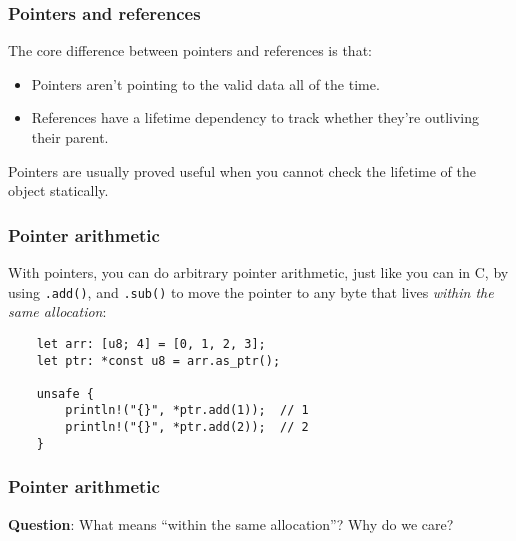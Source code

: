 \documentclass[aspectratio=1610,t]{beamer}
\begin{document}

\begin{frame}[fragile]
\frametitle{Pointers and references}
The core difference between pointers and references is that:

\begin{itemize}
    \item Pointers aren't pointing to the valid data all of the time.
    \item References have a lifetime dependency to track whether they're outliving their parent.
\end{itemize}

Pointers are usually proved useful when you cannot check the lifetime of the object statically.
\end{frame}


\begin{frame}[fragile]
\frametitle{Pointer arithmetic}
With pointers, you can do arbitrary pointer arithmetic, just like you can in C, by using \texttt{.add()}, and \texttt{.sub()} to move the pointer to any byte that lives \textit{within the same allocation}:

\begin{verbatim}
    let arr: [u8; 4] = [0, 1, 2, 3];
    let ptr: *const u8 = arr.as_ptr();

    unsafe {
        println!("{}", *ptr.add(1));  // 1
        println!("{}", *ptr.add(2));  // 2
    }
\end{verbatim}
\end{frame}


\begin{frame}[fragile]
\frametitle{Pointer arithmetic}
\textbf{Question}: What means ``within the same allocation''? Why do we care?



\end{frame}
\end{document}
